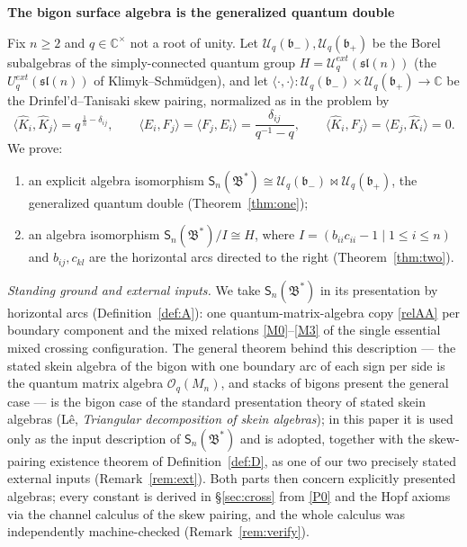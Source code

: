 \documentclass[11pt]{article}
\theoremstyle{definition}
\theoremstyle{remark}
\newcommand{\la}{\langle}
\newcommand{\ra}{\rangle}
\newcommand{\C}{\mathbb{C}}
\newcommand{\Uq}{\mathcal{U}_q}
\newcommand{\bp}{\mathfrak{b}_+}
\newcommand{\bm}{\mathfrak{b}_-}
\newcommand{\B}{\mathfrak{B}}
\newcommand{\Sn}{\mathsf{S}_n}
\newcommand{\del}{\delta}
\newcommand{\ptn}{\bowtie}
\newcommand{\hK}{\hat K}
\begin{document}
\begin{center}
{\LARGE\bfseries The bigon surface algebra is the generalized quantum
double}
\end{center}

\bigskip
\noindent
Fix $n\ge2$ and $q\in\C^\times$ not a root of unity.  Let
$\Uq(\bm),\Uq(\bp)$ be the Borel subalgebras of the simply-connected
quantum group $H=\Uq^{ext}(\mathfrak{sl}(n))$ (the
$U_q^{ext}(\mathfrak{sl}(n))$ of Klimyk--Schm\"udgen), and let
$\la\cdot,\cdot\ra:\Uq(\bm)\times\Uq(\bp)\to\C$ be the
Drinfel'd--Tanisaki skew pairing, normalized as in the problem by
\begin{equation}
\la\hK_i,\hK_j\ra=q^{\,\frac1n-\del_{ij}},\qquad
\la E_i,F_j\ra=\la F_j,E_i\ra=\frac{\del_{ij}}{q^{-1}-q},\qquad
\la\hK_i,F_j\ra=\la E_j,\hK_i\ra=0 .
\label{P0}\tag{P0}
\end{equation}
We prove:
\begin{enumerate}[label=(\arabic*),leftmargin=2em]
\item an explicit algebra isomorphism
  $\Sn(\B^*)\cong\Uq(\bm)\ptn\Uq(\bp)$, the generalized quantum double
  (Theorem~\ref{thm:one});
\item an algebra isomorphism $\Sn(\B^*)/I\cong H$, where
  $I=(b_{ii}c_{ii}-1\mid 1\le i\le n)$ and $b_{ij},c_{kl}$ are the
  horizontal arcs directed to the right (Theorem~\ref{thm:two}).
\end{enumerate}

\noindent\emph{Standing ground and external inputs.}  We take
$\Sn(\B^*)$ in its presentation by horizontal arcs
(Definition~\ref{def:A}): one quantum-matrix-algebra copy
\eqref{relAA} per boundary component and the mixed relations
\eqref{M0}--\eqref{M3} of the single essential mixed crossing
configuration.  The general theorem behind this description — the
stated skein algebra of the bigon with one boundary arc of each sign
per side is the quantum matrix algebra $\mathcal O_q(M_n)$, and
stacks of bigons present the general case — is the bigon case of the
standard presentation theory of stated skein algebras (L\^e,
\emph{Triangular decomposition of skein algebras}); in this paper it
is used only as the input description of $\Sn(\B^*)$ and is adopted,
together with the skew-pairing existence theorem of
Definition~\ref{def:D}, as one of our two precisely stated external
inputs (Remark~\ref{rem:ext}).  Both parts then concern explicitly
presented algebras; every constant is derived in \S\ref{sec:cross}
from \eqref{P0} and the Hopf axioms via the channel calculus of the
skew pairing, and the whole calculus was independently
machine-checked (Remark~\ref{rem:verify}).
\end{document}
